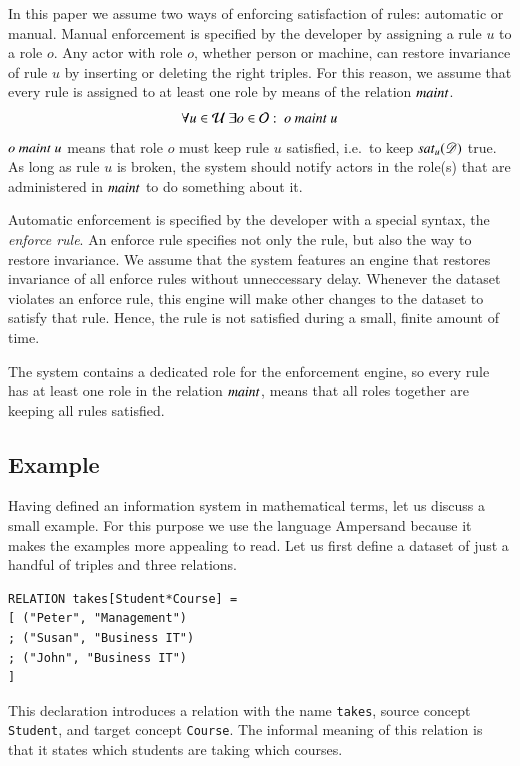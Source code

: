 \documentclass{elsarticle}
\begin{document}
   In this paper we assume two ways of enforcing satisfaction of rules: automatic or manual.
   Manual enforcement is specified by the developer by assigning a rule $u$ to a role $o$.
   Any actor with role $o$, whether person or machine,
   can restore invariance of rule $u$ by inserting or deleting the right triples.
   For this reason, we assume that every rule is assigned to at least one role by means of the relation $\text{\it maint\/}$.
\begin{equation}
   \forall u\in\rules\ \exists o\in\roles:\ o\ \maintain\ u\label{eqn:maintain}
\end{equation}
   $o\ \maintain\ u$ means that role $o$ must keep rule $u$ satisfied, i.e.\ to keep $\text{\it sat\/}_{u}(\mathscr{D})$ true.
   As long as rule $u$ is broken, the system should notify actors in the role(s) that are administered in $\text{\it maint\/}$ to do something about it.

   Automatic enforcement is specified by the developer with a special syntax,
   the {\em enforce rule}.
   An enforce rule specifies not only the rule, but also the way to restore invariance.
   We assume that the system features an engine that restores invariance of all enforce rules without unneccessary delay.
   Whenever the dataset violates an enforce rule,
   this engine will make other changes to the dataset to satisfy that rule.
   Hence, the rule is not satisfied during a small, finite amount of time.

   The system contains a dedicated role for the enforcement engine,
   so every rule has at least one role in the relation $\text{\it maint\/}$, means that all roles together are keeping all rules satisfied.

\subsection{Example}
\label{sct:Example existing IS}
   Having defined an information system in mathematical terms, let us discuss a small example.
   For this purpose we use the language Ampersand
   because it makes the examples more appealing to read.
   Let us first define a dataset of just a handful of triples and three relations.
\begin{verbatim}
RELATION takes[Student*Course] =
[ ("Peter", "Management")
; ("Susan", "Business IT")
; ("John", "Business IT")
]
\end{verbatim}
   This declaration introduces a relation with the name \verb#takes#,
   source concept \verb#Student#, and
   target concept \verb#Course#.
   The informal meaning of this relation is that it states which students are taking which courses.
\end{document}
